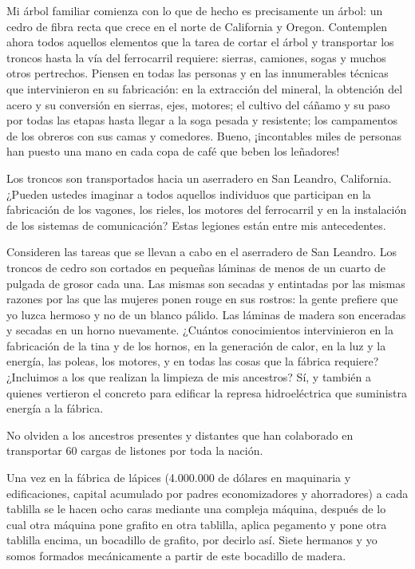 \documentclass[12pt,a4paper,twoside]{book}
\begin{document}
Mi árbol familiar comienza con lo que de hecho es precisamente un árbol: un cedro de fibra recta que crece en el norte de California y Oregon. Contemplen ahora todos aquellos elementos que la tarea de cortar el árbol y transportar los troncos hasta la vía del ferrocarril requiere: sierras, camiones, sogas y muchos otros pertrechos. Piensen en todas las personas y en las innumerables técnicas que intervinieron en su fabricación: en la extracción del mineral, la obtención del acero y su conversión en sierras, ejes, motores; el cultivo del cáñamo y su paso por todas las etapas hasta llegar a la soga pesada y resistente; los campamentos de los obreros con sus camas y comedores. Bueno, ¡incontables miles de personas han puesto una mano en cada copa de café que beben los leñadores!

Los troncos son transportados hacia un aserradero en San Leandro, California. ¿Pueden ustedes imaginar a todos aquellos individuos que participan en la fabricación de los vagones, los rieles, los motores del ferrocarril y en la instalación de los sistemas de comunicación? Estas legiones están entre mis antecedentes.

Consideren las tareas que se llevan a cabo en el aserradero de San Leandro. Los troncos de cedro son cortados en pequeñas láminas de menos de un cuarto de pulgada de grosor cada una. Las mismas son secadas y entintadas por las mismas razones por las que las mujeres ponen rouge en sus rostros: la gente prefiere que yo luzca hermoso y no de un blanco pálido. Las láminas de madera son enceradas y secadas en un horno nuevamente. ¿Cuántos conocimientos intervinieron en la fabricación de la tina y de los hornos, en la generación de calor, en la luz y la energía, las poleas, los motores, y en todas las cosas que la fábrica requiere? ¿Incluimos a los que realizan la limpieza de mis ancestros? Sí, y también a quienes vertieron el concreto para edificar la represa hidroeléctrica que suministra energía a la fábrica.

No olviden a los ancestros presentes y distantes que han colaborado en transportar 60 cargas de listones por toda la nación.

Una vez en la fábrica de lápices (4.000.000 de dólares en maquinaria y edificaciones, capital acumulado por padres economizadores y ahorradores) a cada tablilla se le hacen ocho caras mediante una compleja máquina, después de lo cual otra máquina pone grafito en otra tablilla, aplica pegamento y pone otra tablilla encima, un bocadillo de grafito, por decirlo así. Siete hermanos y yo somos formados mecánicamente a partir de este bocadillo de madera.
\end{document}
